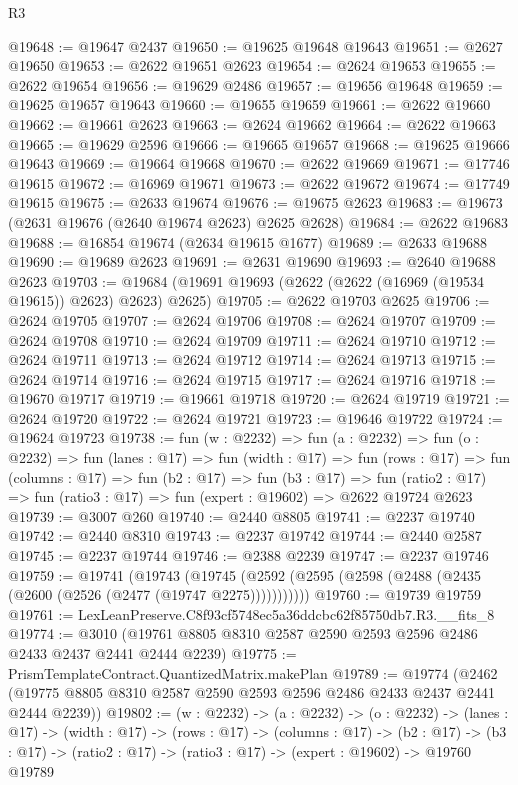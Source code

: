\begin{lexlean}{R3}
\begin{coremodule}
@19648 := @19647 @2437
@19650 := @19625 @19648 @19643
@19651 := @2627 @19650
@19653 := @2622 @19651 @2623
@19654 := @2624 @19653
@19655 := @2622 @19654
@19656 := @19629 @2486
@19657 := @19656 @19648
@19659 := @19625 @19657 @19643
@19660 := @19655 @19659
@19661 := @2622 @19660
@19662 := @19661 @2623
@19663 := @2624 @19662
@19664 := @2622 @19663
@19665 := @19629 @2596
@19666 := @19665 @19657
@19668 := @19625 @19666 @19643
@19669 := @19664 @19668
@19670 := @2622 @19669
@19671 := @17746 @19615
@19672 := @16969 @19671
@19673 := @2622 @19672
@19674 := @17749 @19615
@19675 := @2633 @19674
@19676 := @19675 @2623
@19683 := @19673 (@2631 @19676 (@2640 @19674 @2623) @2625 @2628)
@19684 := @2622 @19683
@19688 := @16854 @19674 (@2634 @19615 @1677)
@19689 := @2633 @19688
@19690 := @19689 @2623
@19691 := @2631 @19690
@19693 := @2640 @19688 @2623
@19703 := @19684 (@19691 @19693 (@2622 (@2622 (@16969 (@19534 @19615)) @2623) @2623) @2625)
@19705 := @2622 @19703 @2625
@19706 := @2624 @19705
@19707 := @2624 @19706
@19708 := @2624 @19707
@19709 := @2624 @19708
@19710 := @2624 @19709
@19711 := @2624 @19710
@19712 := @2624 @19711
@19713 := @2624 @19712
@19714 := @2624 @19713
@19715 := @2624 @19714
@19716 := @2624 @19715
@19717 := @2624 @19716
@19718 := @19670 @19717
@19719 := @19661 @19718
@19720 := @2624 @19719
@19721 := @2624 @19720
@19722 := @2624 @19721
@19723 := @19646 @19722
@19724 := @19624 @19723
@19738 := fun (w : @2232) =>
  fun (a : @2232) =>
  fun (o : @2232) =>
  fun (lanes : @17) =>
  fun (width : @17) =>
  fun (rows : @17) =>
  fun (columns : @17) =>
  fun (b2 : @17) =>
  fun (b3 : @17) =>
  fun (ratio2 : @17) => fun (ratio3 : @17) => fun (expert : @19602) => @2622 @19724 @2623
@19739 := @3007 @260
@19740 := @2440 @8805
@19741 := @2237 @19740
@19742 := @2440 @8310
@19743 := @2237 @19742
@19744 := @2440 @2587
@19745 := @2237 @19744
@19746 := @2388 @2239
@19747 := @2237 @19746
@19759 := @19741
    (@19743 (@19745 (@2592 (@2595 (@2598 (@2488 (@2435 (@2600 (@2526 (@2477 (@19747 @2275)))))))))))
@19760 := @19739 @19759
@19761 := LexLeanPreserve.C8f93cf5748ec5a36ddcbc62f85750db7.R3.__fits_8
@19774 := @3010 (@19761 @8805 @8310 @2587 @2590 @2593 @2596 @2486 @2433 @2437 @2441 @2444 @2239)
@19775 := PrismTemplateContract.QuantizedMatrix.makePlan
@19789 := @19774
    (@2462 (@19775 @8805 @8310 @2587 @2590 @2593 @2596 @2486 @2433 @2437 @2441 @2444 @2239))
@19802 := (w : @2232) ->
  (a : @2232) ->
  (o : @2232) ->
  (lanes : @17) ->
  (width : @17) ->
  (rows : @17) ->
  (columns : @17) ->
  (b2 : @17) -> (b3 : @17) -> (ratio2 : @17) -> (ratio3 : @17) -> (expert : @19602) -> @19760 @19789

\end{coremodule}
\end{lexlean}
